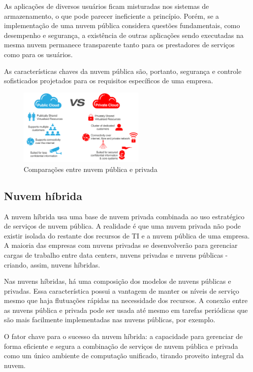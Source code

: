 As aplicações de diversos usuários ficam misturadas nos sistemas de armazenamento,
o que pode parecer ineficiente a princípio. Porém, se a implementação de uma nuvem
pública considera questões fundamentais, como desempenho e segurança, a existência
de outras aplicações sendo executadas na mesma nuvem permanece transparente tanto
para os prestadores de serviços como para os usuários.

As características chaves da nuvem pública são, portanto, segurança e controle
sofisticados projetados para os requisitos específicos de uma empresa.

\begin{figure}[ht]
    \centering
    \includegraphics[width=0.55\textwidth]{img/privatePublic.png}
    \caption{Comparações entre nuvem pública e privada}
\end{figure}

\subsection{Nuvem híbrida}

A nuvem híbrida usa uma base de nuvem privada combinada ao uso estratégico de
serviços de nuvem pública. A realidade é que uma nuvem privada não pode existir
isolada do restante dos recursos de TI e a nuvem pública de uma empresa. A maioria
das empresas com nuvens privadas se desenvolverão para gerenciar cargas de trabalho
entre data centers, nuvens privadas e nuvens públicas - criando, assim, nuvens
híbridas.

Nas nuvens híbridas, há uma composição dos modelos de nuvens públicas e privadas.
Essa característica possui a vantagem de manter os níveis de serviço mesmo que
haja flutuações rápidas na necessidade dos recursos. A conexão entre as nuvens
pública e privada pode ser usada até mesmo em tarefas periódicas que são mais
facilmente implementadas nas nuvens públicas, por exemplo.

O fator chave para o sucesso da nuvem híbrida: a capacidade para gerenciar de
forma eficiente e segura a combinação de serviços de nuvem pública e privada
como um único ambiente de computação unificado, tirando proveito integral da
nuvem.

